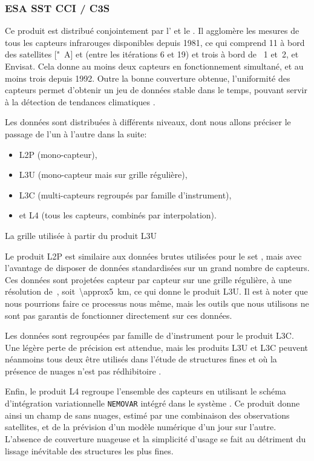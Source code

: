 \subsubsection{ESA SST CCI / C3S}

Ce produit est distribué conjointement par l'   et le .
Il agglomère les mesures de tous les capteurs infrarouges disponibles depuis 1981, ce qui comprend 11  à bord des satellites ["~A] et  (entre les itérations 6 et 19) et trois  à bord de ~1 et~2, et Envisat.
Cela donne au moins deux capteurs en fonctionnement simultané, et au moins trois depuis 1992.
Outre la bonne couverture obtenue, l'uniformité des capteurs permet d'obtenir un jeu de données stable dans le temps, pouvant servir à la détection de tendances climatiques \parencite{merchant_2019}.

Les données sont distribuées à différents niveaux, dont nous allons préciser le passage de l'un à l'autre dans la suite:
\begin{itemize}
  \item L2P (mono-capteur),
  \item L3U (mono-capteur mais sur grille régulière),
  \item L3C (multi-capteurs regroupés par famille d'instrument),
  \item et L4 (tous les capteurs, combinés par interpolation).
\end{itemize}
La grille utilisée à partir du produit L3U

Le produit L2P est similaire aux données brutes utilisées pour le set ,
mais avec l'avantage de disposer de données standardisées sur un grand nombre de capteurs.
Ces données sont projetées capteur par capteur sur une grille régulière, à une résolution de~, soit~\qty{\approx5}{\km}, ce qui donne le produit L3U.
Il est à noter que nous pourrions faire ce processus nous même, mais les outils que nous utilisons ne sont pas garantis de fonctionner directement sur ces données.

Les données sont regroupées par famille de d'instrument pour le produit L3C. Une légère perte de précision est attendue, mais les produits L3U et L3C peuvent néanmoins tous deux être utilisés dans l'étude de structures fines et où la présence de nuages n'est pas rédhibitoire \parencite{merchant_2019}.

Enfin, le produit L4 regroupe l'ensemble des capteurs en utilisant le schéma d'intégration variationnelle \verb|NEMOVAR| intégré dans le système  \parencite{good_2020}.
Ce produit donne ainsi un champ de  sans nuages, estimé par une combinaison des observations satellites, et de la prévision d'un modèle numérique d'un jour sur l'autre.
L'absence de couverture nuageuse et la simplicité d'usage se fait au détriment du lissage inévitable des structures les plus fines.

